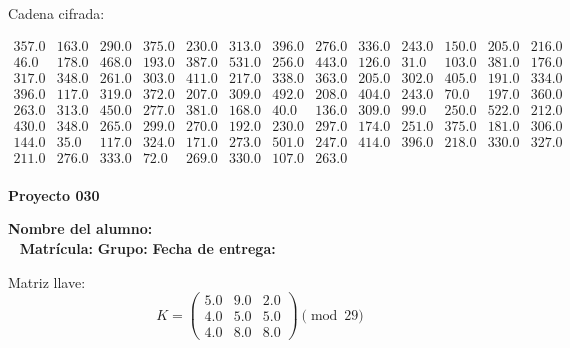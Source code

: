 \documentclass[12pt]{article}
\begin{document}
Cadena cifrada:
\begin{center}
$\begin{array}{lllllllllllll}
357.0 & 163.0 & 290.0 & 375.0 & 230.0 & 313.0 & 396.0 & 276.0 & 336.0 & 243.0 & 150.0 & 205.0 & 216.0\\
46.0 & 178.0 & 468.0 & 193.0 & 387.0 & 531.0 & 256.0 & 443.0 & 126.0 & 31.0 & 103.0 & 381.0 & 176.0\\
317.0 & 348.0 & 261.0 & 303.0 & 411.0 & 217.0 & 338.0 & 363.0 & 205.0 & 302.0 & 405.0 & 191.0 & 334.0\\
396.0 & 117.0 & 319.0 & 372.0 & 207.0 & 309.0 & 492.0 & 208.0 & 404.0 & 243.0 & 70.0 & 197.0 & 360.0\\
263.0 & 313.0 & 450.0 & 277.0 & 381.0 & 168.0 & 40.0 & 136.0 & 309.0 & 99.0 & 250.0 & 522.0 & 212.0\\
430.0 & 348.0 & 265.0 & 299.0 & 270.0 & 192.0 & 230.0 & 297.0 & 174.0 & 251.0 & 375.0 & 181.0 & 306.0\\
144.0 & 35.0 & 117.0 & 324.0 & 171.0 & 273.0 & 501.0 & 247.0 & 414.0 & 396.0 & 218.0 & 330.0 & 327.0\\
211.0 & 276.0 & 333.0 & 72.0 & 269.0 & 330.0 & 107.0 & 263.0\\
\end{array}$
\end{center}

\newpage


\textbf{Proyecto 030}

\textbf{Nombre del alumno:} \underline{\hspace{13cm}}\\\
\vspace{1cm}
\textbf{Matrícula:} \underline{\hspace{4cm}} \hspace{1cm}
\textbf{Grupo:} \underline{\hspace{2cm}}
\textbf{Fecha de entrega:} \underline{\hspace{2cm}}

\medskip

Matriz llave:
\[
K = \begin{pmatrix}
5.0 & 9.0 & 2.0\\
4.0 & 5.0 & 5.0\\
4.0 & 8.0 & 8.0
\end{pmatrix} \pmod{29}
\]
\end{document}
